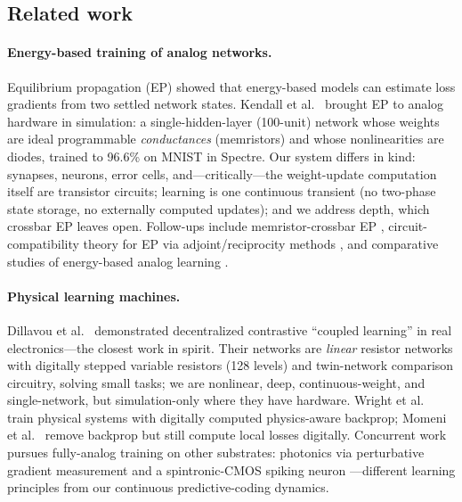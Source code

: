 \documentclass[11pt]{article}
\begin{document}
\subsection{Related work}
\label{sec:related}

\paragraph{Energy-based training of analog networks.} Equilibrium propagation (EP) \cite{scellier2017} showed that energy-based models can estimate loss gradients from two settled network states. Kendall et al.~\cite{kendall2020} brought EP to analog hardware in simulation: a single-hidden-layer (100-unit) network whose weights are ideal programmable \emph{conductances} (memristors) and whose nonlinearities are diodes, trained to 96.6\% on MNIST in Spectre. Our system differs in kind: synapses, neurons, error cells, and---critically---the weight-update computation itself are transistor circuits; learning is one continuous transient (no two-phase state storage, no externally computed updates); and we address depth, which crossbar EP leaves open. Follow-ups include memristor-crossbar EP \cite{oh2023}, circuit-compatibility theory for EP via adjoint/reciprocity methods \cite{lirmm2025}, and comparative studies of energy-based analog learning \cite{scellier2023comp}.

\paragraph{Physical learning machines.} Dillavou et al.~\cite{dillavou2022} demonstrated decentralized contrastive ``coupled learning'' in real electronics---the closest work in spirit. Their networks are \emph{linear} resistor networks with digitally stepped variable resistors (128 levels) and twin-network comparison circuitry, solving small tasks; we are nonlinear, deep, continuous-weight, and single-network, but simulation-only where they have hardware. Wright et al.~\cite{wright2022} train physical systems with digitally computed physics-aware backprop; Momeni et al.~\cite{momeni2023} remove backprop but still compute local losses digitally. Concurrent work pursues fully-analog training on other substrates: photonics via perturbative gradient measurement \cite{photonic2025} and a spintronic-CMOS spiking neuron \cite{spintronic2025}---different learning principles from our continuous predictive-coding dynamics.
\end{document}
